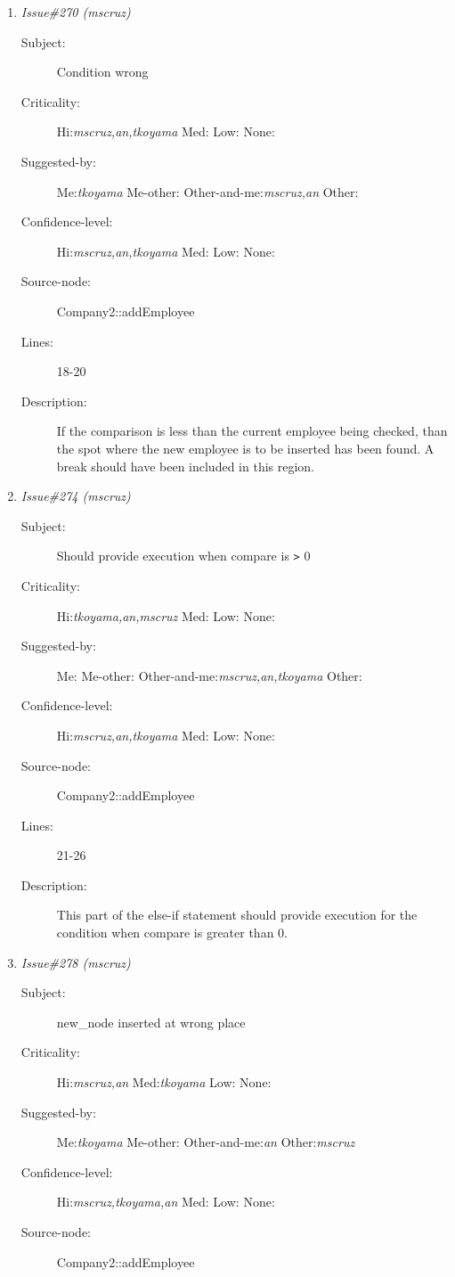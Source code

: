 \begin{enumerate}
\begin{description}
\item [Lines:] 14-15

\item [Description:] According to the specs, 0 is an indication of
success.  This is a failure so should pass back a 1.
\end{description}
\item {\it Issue\#270 (mscruz)}
\begin{description}
\item [Subject:] Condition wrong
\item [Criticality:] Hi:{\it mscruz,an,tkoyama} Med:{\it } Low:{\it } None:{\it }
\item [Suggested-by:] Me:{\it tkoyama} Me-other:{\it } Other-and-me:{\it mscruz,an} Other:{\it }
\item [Confidence-level:] Hi:{\it mscruz,an,tkoyama} Med:{\it } Low:{\it } None:{\it }
\item [Source-node:] Company2::addEmployee

\item [Lines:] 18-20

\item [Description:] If the comparison is less than the current
employee being checked, than the spot where the new employee is to be
inserted has been found.  A break should have been included in this region.
\end{description}
\item {\it Issue\#274 (mscruz)}
\begin{description}
\item [Subject:] Should provide execution when compare is {\tt >} 0
\item [Criticality:] Hi:{\it tkoyama,an,mscruz} Med:{\it } Low:{\it } None:{\it }
\item [Suggested-by:] Me:{\it } Me-other:{\it } Other-and-me:{\it mscruz,an,tkoyama} Other:{\it }
\item [Confidence-level:] Hi:{\it mscruz,an,tkoyama} Med:{\it } Low:{\it } None:{\it }
\item [Source-node:] Company2::addEmployee

\item [Lines:] 21-26

\item [Description:] This part of the else-if statement should
provide execution for the condition when compare is greater than 0.
\end{description}
\item {\it Issue\#278 (mscruz)}
\begin{description}
\item [Subject:] new\_node inserted at wrong place
\item [Criticality:] Hi:{\it mscruz,an} Med:{\it tkoyama} Low:{\it } None:{\it }
\item [Suggested-by:] Me:{\it tkoyama} Me-other:{\it } Other-and-me:{\it an} Other:{\it mscruz}
\item [Confidence-level:] Hi:{\it mscruz,tkoyama,an} Med:{\it } Low:{\it } None:{\it }
\item [Source-node:] Company2::addEmployee


\end{description}
\end{enumerate}
